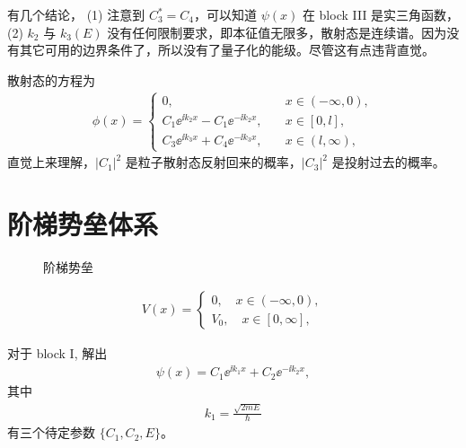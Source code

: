 有几个结论，
(1) 注意到 $C_3^* = C_4$，可以知道 $\psi(x)$ 在 block III 是实三角函数，
(2) $k_2$ 与 $k_3(E)$ 没有任何限制要求，即本征值无限多，散射态是连续谱。因为没有其它可用的边界条件了，所以没有了量子化的能级。尽管这有点违背直觉。


散射态的方程为
\begin{eqnarray}
    \phi (x) = \begin{cases}
        0, \quad &x \in (-\infty, 0), \\
        C_1 \ee^{\ii k_2 x} - C_1 \ee^{-\ii k_2 x}, \quad &x \in [0,l], \\
        C_3 \ee^{\ii k_3 x} + C_4 \ee^{-\ii k_3 x}, \quad &x \in (l, \infty),
    \end{cases}
\end{eqnarray}
直觉上来理解，$|C_1|^2$ 是粒子散射态反射回来的概率，$|C_3|^2$ 是投射过去的概率。


\section{阶梯势垒体系}
\begin{figure}[tp]\centering
\caption{阶梯势垒}
\end{figure}
\begin{eqnarray}
    V(x) = 
\begin{cases}
    0, \quad x\in(-\infty, 0), \\
    V_0, \quad x\in[0, \infty],
\end{cases}
\end{eqnarray}

对于 block I, 解出
\begin{eqnarray}
    \psi(x) = C_1 \ee^{\ii k_1 x} + C_2 \ee^{- \ii k_2 x},
\end{eqnarray}
其中
\begin{eqnarray}
    k_1 = \frac{\sqrt{2mE}}{\hbar}
\end{eqnarray}
有三个待定参数 $\{C_1, C_2, E\}$。

